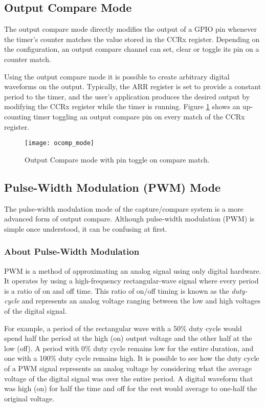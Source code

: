 \documentclass[openany,11pt,fleqn]{book} %
\begin{document}
    
    \subsection{Output Compare Mode}
        The output compare mode directly modifies the output of a GPIO pin whenever the timer's counter matches the value stored in the CCRx register. Depending on the configuration, an output compare channel can set, clear or toggle its pin on a counter match. 
        
        Using the output compare mode it is possible to create arbitrary digital waveforms on the output. Typically, the ARR register is set to provide a constant period to the timer, and the user's application produces the desired output by modifying the CCRx register while the timer is running. Figure \ref{ocomp_mode} shows an up-counting timer toggling an output compare pin on every match of the CCRx register. 

        \begin{figure}[]
            \centering\texttt{[image: ocomp\_mode]}
            \caption{Output Compare mode with pin toggle on compare match.}
            \label{ocomp_mode}
        \end{figure}
    
    
    \subsection{Pulse-Width Modulation (PWM) Mode}
    The pulse-width modulation mode of the capture/compare system is a more advanced form of output compare. Although pulse-width modulation (PWM) is simple once understood, it can be confusing at first. 
    
    \subsubsection{About Pulse-Width Modulation}
    PWM is a method of approximating an analog signal using only digital hardware. It operates by using a high-frequency rectangular-wave signal where every period is a ratio of on and off time. This ratio of on/off timing is known as the \textit{duty-cycle} and represents an analog voltage ranging between the low and high voltages of the digital signal. 
    
    For example, a period of the rectangular wave with a 50\% duty cycle would spend half the period at the high (on) output voltage and the other half at the low (off). A period with 0\% duty cycle remains low for the entire duration, and one with a 100\% duty cycle remains high. It is possible to see how the duty cycle of a PWM signal represents an analog voltage by considering what the average voltage of the digital signal was over the entire period. A digital waveform that was high (on) for half the time and off for the rest would average to one-half the original voltage.  
    
\end{document}
